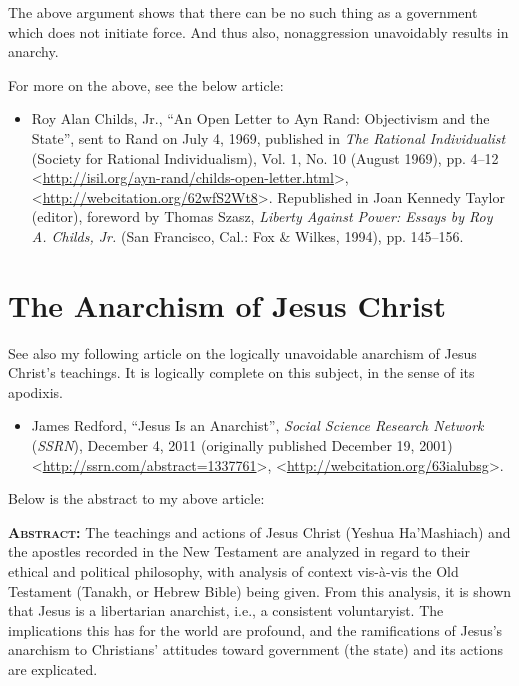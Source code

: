 \documentclass[letterpaper,12pt]{article}
\makeatletter
\newcommand{\asterism}{\smash{%
  \raisebox{-.5ex}{%
    \setlength{\tabcolsep}{-.5pt}%
    \begin{tabular}{@{}cc@{}}%
      \multicolumn2c*\\[-2ex]*&*%
    \end{tabular}}}}
\newenvironment{squote}
  {\quote\small}
  {\endquote}
\makeatother
\begin{document}
The above argument shows that there can be no such thing as a government which does not initiate force. And thus also, nonaggression unavoidably results in anarchy.

\vspace{1em}
\centerline{\asterism}
\vspace{1em}

For more on the above, see the below article:

\begin{itemize}
\small
\item Roy Alan Childs, Jr., ``An Open Letter to Ayn Rand: Objectivism and the State'', sent to Rand on July 4, 1969, published in \emph{The Rational Individualist} (Society for Rational Individualism), Vol. 1, No. 10 (August 1969), pp. 4--12 \textless\url{http://isil.org/ayn-rand/childs-open-letter.html}\textgreater , \textless\url{http://webcitation.org/62wfS2Wt8}\textgreater . Republished in Joan Kennedy Taylor (editor), foreword by Thomas Szasz, \emph{Liberty Against Power: Essays by Roy A. Childs, Jr.} (San Francisco, Cal.: Fox \& Wilkes, 1994), pp. 145--156.
\end{itemize}

\section{The Anarchism of Jesus Christ}
\label{sec:AnarchismOfJesusChrist}

See also my following article on the logically unavoidable anarchism of Jesus Christ's teachings. It is logically complete on this subject, in the sense of its apodixis.

\begin{itemize}
\small
\item James Redford, ``Jesus Is an Anarchist'', \emph{Social Science Research Network} (\emph{SSRN}), December 4, 2011 (originally published December 19, 2001) \textless\url{http://ssrn.com/abstract=1337761}\textgreater , \textless\url{http://webcitation.org/63ialubsg}\textgreater .
\end{itemize}

Below is the abstract to my above article:

\begin{squote}
\textbf{\textsc{Abstract}:}\hspace{0.5em} The teachings and actions of Jesus Christ (Yeshua Ha'Mashiach) and the apostles recorded in the New Testament are analyzed in regard to their ethical and political philosophy, with analysis of context vis-\`{a}-vis the Old Testament (Tanakh, or Hebrew Bible) being given. From this analysis, it is shown that Jesus is a libertarian anarchist, i.e., a consistent voluntaryist. The implications this has for the world are profound, and the ramifications of Jesus's anarchism to Christians' attitudes toward government (the state) and its actions are explicated.
\end{squote}
\end{document}
